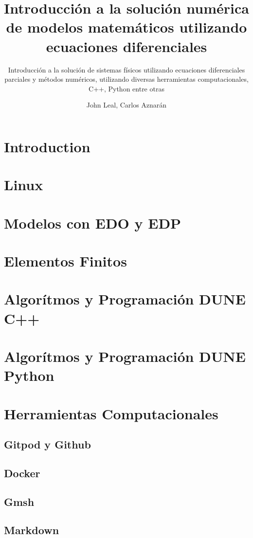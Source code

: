 \documentclass[10pt,
	a4paper,
	spanish,
	titlepage=firstiscover,
	titlepage=true,
	BCOR=2cm,
	DIV=12
]{scrbook}
\author{John Leal, Carlos Aznarán}
\title{Introducción a la solución numérica de modelos matemáticos utilizando ecuaciones diferenciales}
\subtitle{Introducción a la solución de sistemas físicos utilizando ecuaciones diferenciales parciales y métodos numéricos, utilizando diversas herramientas computacionales, C++, Python entre otras}
\begin{document}
\maketitle

\begin{refsection}
	\chapter{Introduction}
	
	\chapter{Linux}
	
	\chapter{Modelos con EDO y EDP}
	
	\chapter{Elementos Finitos}
	
	\chapter{Algorítmos y Programación DUNE C++}
	
	\chapter{Algorítmos y Programación DUNE Python}
	
	\chapter{Herramientas Computacionales}
	\section{Gitpod y Github}
	\section{Docker}
	
	\section{Gmsh}
	\section{Markdown}

\end{refsection}
\end{document}

